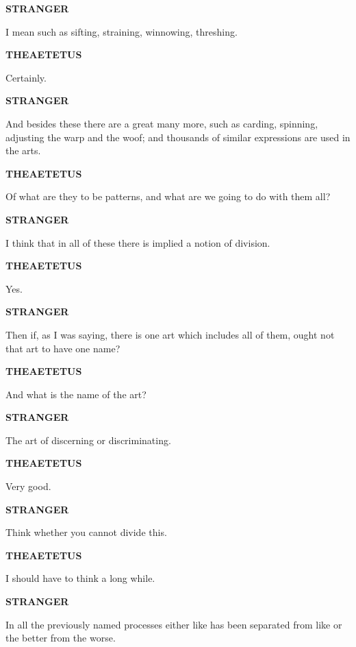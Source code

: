 \documentclass[11pt,letter]{article}
\begin{document}
\par \textbf{STRANGER}
\par   I mean such as sifting, straining, winnowing, threshing.

\par \textbf{THEAETETUS}
\par   Certainly.

\par \textbf{STRANGER}
\par   And besides these there are a great many more, such as carding, spinning, adjusting the warp and the woof; and thousands of similar expressions are used in the arts.

\par \textbf{THEAETETUS}
\par   Of what are they to be patterns, and what are we going to do with them all?

\par \textbf{STRANGER}
\par   I think that in all of these there is implied a notion of division.

\par \textbf{THEAETETUS}
\par   Yes.

\par \textbf{STRANGER}
\par   Then if, as I was saying, there is one art which includes all of them, ought not that art to have one name?

\par \textbf{THEAETETUS}
\par   And what is the name of the art?

\par \textbf{STRANGER}
\par   The art of discerning or discriminating.

\par \textbf{THEAETETUS}
\par   Very good.

\par \textbf{STRANGER}
\par   Think whether you cannot divide this.

\par \textbf{THEAETETUS}
\par   I should have to think a long while.

\par \textbf{STRANGER}
\par   In all the previously named processes either like has been separated from like or the better from the worse.
\end{document}
